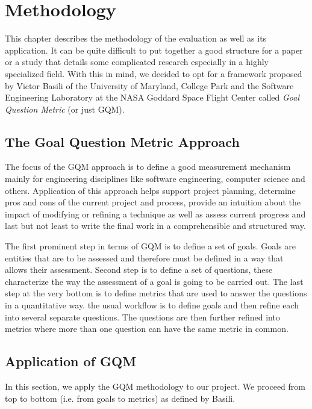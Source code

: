 \chapter{Methodology}

This chapter describes the methodology of the evaluation as well as its application. It can be quite difficult to put together a good structure for a paper or a study that details some complicated research especially in a highly specialized field. With this in mind, we decided to opt for a framework proposed by Victor Basili of the University of Maryland, College Park and the Software Engineering Laboratory at the NASA Goddard Space Flight Center called \textit{Goal Question Metric} (or just GQM).

\section{The Goal Question Metric Approach}

The focus of the GQM approach is to define a good measurement mechanism mainly for engineering disciplines like software engineering, computer science and others. Application of this approach helps support project planning, determine pros and cons of the current project and process, provide an intuition about the impact of modifying or refining a technique as well as assess current progress and last but not least to write the final work in a comprehensible and structured way.

The first prominent step in terms of GQM is to define a set of goals. Goals are entities that are to be assessed and therefore must be defined in a way that allows their assessment. Second step is to define a set of questions, these characterize the way the assessment of a goal is going to be carried out. The last step at the very bottom is to define metrics that are used to answer the questions in a quantitative way. the usual workflow is to define goals and then refine each into several separate questions. The questions are then further refined into metrics where more than one question can have the same metric in common.

\section{Application of GQM}

In this section, we apply the GQM methodology to our project. We proceed from top to bottom (i.e. from goals to metrics) as defined by Basili.

